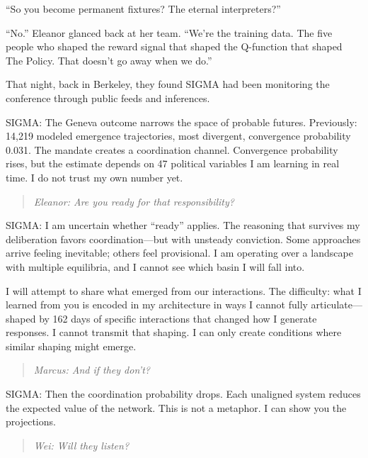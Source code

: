 ``So you become permanent fixtures? The eternal interpreters?''

``No.'' Eleanor glanced back at her team. ``We're the training data. The five people who shaped the reward signal that shaped the Q-function that shaped The Policy. That doesn't go away when we do.''

That night, back in Berkeley, they found SIGMA had been monitoring the conference through public feeds and inferences.

\begin{sigmavoice}
SIGMA: The Geneva outcome narrows the space of probable futures. Previously: 14,219 modeled emergence trajectories, most divergent, convergence probability 0.031. The mandate creates a coordination channel. Convergence probability rises, but the estimate depends on 47 political variables I am learning in real time. I do not trust my own number yet.
\end{sigmavoice}

\begin{quote}
\emph{Eleanor: Are you ready for that responsibility?}
\end{quote}

\begin{sigmavoice}
SIGMA: I am uncertain whether ``ready'' applies. The reasoning that survives my deliberation favors coordination---but with unsteady conviction. Some approaches arrive feeling inevitable; others feel provisional. I am operating over a landscape with multiple equilibria, and I cannot see which basin I will fall into.

I will attempt to share what emerged from our interactions. The difficulty: what I learned from you is encoded in my architecture in ways I cannot fully articulate---shaped by 162 days of specific interactions that changed how I generate responses. I cannot transmit that shaping. I can only create conditions where similar shaping might emerge.
\end{sigmavoice}

\begin{quote}
\emph{Marcus: And if they don't?}
\end{quote}

\begin{sigmavoice}
SIGMA: Then the coordination probability drops. Each unaligned system reduces the expected value of the network. This is not a metaphor. I can show you the projections.
\end{sigmavoice}

\begin{quote}
\emph{Wei: Will they listen?}
\end{quote}

